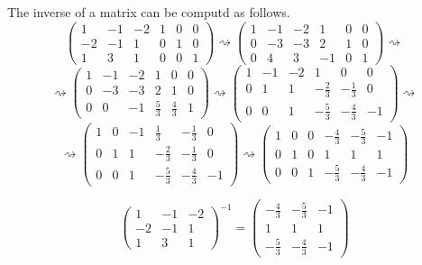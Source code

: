 \begin{remark}
   The inverse of a matrix can be computd as follows.
   \[\left(\begin{array}{ccc|ccc}
      1   & -1 & -2 & 1 & 0 & 0 \\
      -2  & -1 & 1  & 0 & 1 & 0 \\
      1   & 3  & 1  & 0 & 0 & 1
      \end{array}\right) \rightsquigarrow
      \left(\begin{array}{ccc|ccc}
         1 & -1 & -2 & 1 & 0 & 0 \\
         0 & -3 & -3 & 2 & 1 & 0 \\
         0 & 4  & 3  & -1 & 0 & 1
      \end{array}\right) \rightsquigarrow\]
   \[\rightsquigarrow \left(\begin{array}{ccc|ccc}
         1 & -1 & -2 & 1 & 0 & 0 \\
         0 & -3 & -3 & 2 & 1 & 0 \\
         0 & 0  & -1  & \frac{5}{3} & \frac{4}{3} & 1
      \end{array}\right) \rightsquigarrow
      \left(\begin{array}{ccc|ccc}
         1 & -1 & -2 & 1 & 0 & 0 \\
         0 & 1  & 1  & -\frac{2}{3} & -\frac{1}{3} & 0 \\
         0 & 0  & 1  &  -\frac{5}{3} & -\frac{4}{3} & -1
      \end{array}\right) \rightsquigarrow\]
   \[\rightsquigarrow \left(\begin{array}{ccc|ccc}
         1 & 0 & -1  & \frac{1}{3} & -\frac{1}{3} & 0 \\
         0 & 1  & 1  & -\frac{2}{3} & -\frac{1}{3} & 0 \\
         0 & 0  & 1  &  -\frac{5}{3} & -\frac{4}{3} & -1
      \end{array}\right) \rightsquigarrow
      \left(\begin{array}{ccc|ccc}
         1 & 0 & 0 & -\frac{4}{3} & -\frac{5}{3} & -1 \\
         0 & 1 & 0 & 1            & 1            & 1 \\
         0 & 0 & 1 & -\frac{5}{3} & -\frac{4}{3} & -1
      \end{array}\right)\]

   \[\begin{pmatrix}
      1   & -1 & -2 \\
      -2  & -1 & 1  \\
      1   & 3  & 1
   \end{pmatrix}^{-1} = \begin{pmatrix}
      -\frac{4}{3} & -\frac{5}{3} & -1 \\
      1            & 1            & 1 \\
      -\frac{5}{3} & -\frac{4}{3} & -1
   \end{pmatrix}\]
\end{remark}


